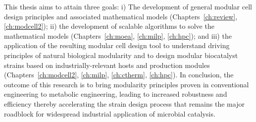 
This thesis aims to attain three goals:
i) The development of general modular cell design principles and associated mathematical models (Chapters~\ref{ch:review}, \ref{ch:modcell2});
ii) the development of scalable algorithms to solve the mathematical models (Chapters~\ref{ch:moea}, \ref{ch:milp}, \ref{ch:hpc});
and iii) the application of the resulting modular cell design tool to understand driving principles of natural biological modularity and to design modular biocatalyst strains based on industrially-relevant hosts and production modules (Chapters~\ref{ch:modcell2}, \ref{ch:milp}, \ref{ch:ctherm}, \ref{ch:hpc}).
In conclusion, the outcome of this research is to bring modularity principles proven in conventional engineering to metabolic engineering, leading to increased robustness and efficiency thereby accelerating the strain design process that remains the major roadblock for widespread industrial application of microbial catalysis.

